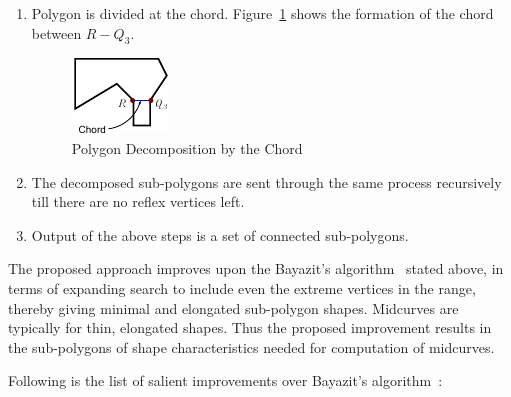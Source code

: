 \begin{enumerate}
\begin{enumerate}
\end{enumerate}

\item Polygon is divided at the chord. Figure~\ref{fig_divide} shows the formation of the chord between $R-Q_3$.


\begin{figure}[h]
\centering \includegraphics[width=0.28\linewidth]{images/polydecomp_divide_1.pdf} 
\caption{Polygon Decomposition by the Chord}
\label{fig_divide}
\end{figure}



\item 
The decomposed sub-polygons are sent through the same process recursively till there are no reflex vertices left. 

\item  
Output of the above steps is a set of connected sub-polygons. 

\end{enumerate}



The proposed approach improves upon the Bayazit's algorithm~\cite{Bayazit} stated above, in terms of expanding search to include even the extreme vertices in the range, thereby giving minimal and elongated sub-polygon shapes. Midcurves are typically for thin, elongated shapes. Thus the proposed improvement results in the sub-polygons of shape characteristics needed for computation of midcurves.

Following is the list of salient improvements over  Bayazit's algorithm~\cite{Bayazit}:

